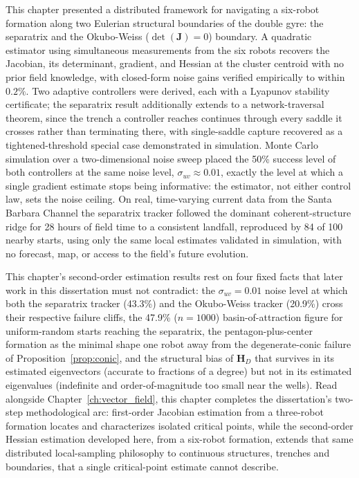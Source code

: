 \documentclass[12pt, letterpaper, oneside]{report}
\begin{document}
This chapter presented a distributed framework for navigating a six-robot
formation along two Eulerian structural boundaries of the double gyre: the
separatrix and the Okubo-Weiss ($\det(\mathbf{J}) = 0$) boundary. A quadratic
estimator using simultaneous measurements from the six robots recovers the
Jacobian, its determinant, gradient, and Hessian at the cluster centroid with
no prior field knowledge, with closed-form noise gains verified empirically
to within $0.2\%$. Two adaptive controllers were derived, each with a
Lyapunov stability certificate; the separatrix result additionally extends
to a network-traversal theorem, since the trench a controller reaches
continues through every saddle it crosses rather than terminating there,
with single-saddle capture recovered as a tightened-threshold special case
demonstrated in simulation. Monte Carlo simulation over a two-dimensional
noise sweep placed the 50\% success level of both controllers at the same
noise level, $\sigma_{uv} \approx 0.01$, exactly the level at which a
single gradient estimate stops being informative: the estimator, not
either control law, sets the noise ceiling. On real, time-varying current
data from the Santa Barbara Channel the separatrix tracker followed the
dominant coherent-structure ridge for 28 hours of field time to a
consistent landfall, reproduced by 84 of 100 nearby starts, using only
the same local estimates validated in simulation, with no forecast, map,
or access to the field's future evolution.

This chapter's second-order estimation results rest on four fixed facts
that later work in this dissertation must not contradict: the
$\sigma_{uv} = 0.01$ noise level at which both the separatrix tracker
(43.3\%) and the Okubo-Weiss tracker (20.9\%) cross their respective
failure cliffs, the 47.9\% ($n = 1000$) basin-of-attraction figure for
uniform-random starts reaching the separatrix, the pentagon-plus-center
formation as the minimal shape one robot away from the degenerate-conic
failure of Proposition~\ref{prop:conic}, and the structural bias of
$\mathbf{H}_D$ that survives in its estimated eigenvectors (accurate to
fractions of a degree) but not in its estimated eigenvalues (indefinite
and order-of-magnitude too small near the wells). Read alongside
Chapter~\ref{ch:vector_field}, this chapter completes the dissertation's
two-step methodological arc: first-order Jacobian estimation from a
three-robot formation locates and characterizes isolated critical points,
while the second-order Hessian estimation developed here, from a
six-robot formation, extends that same distributed local-sampling
philosophy to continuous structures, trenches and boundaries, that a
single critical-point estimate cannot describe.
\end{document}
